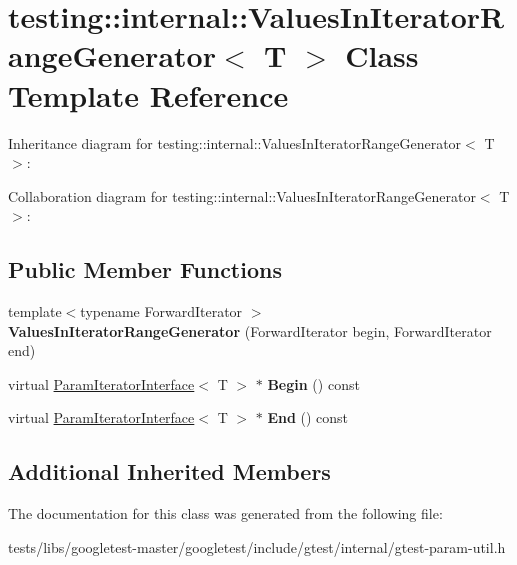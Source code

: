 \hypertarget{classtesting_1_1internal_1_1ValuesInIteratorRangeGenerator}{}\section{testing\+:\+:internal\+:\+:Values\+In\+Iterator\+Range\+Generator$<$ T $>$ Class Template Reference}
\label{classtesting_1_1internal_1_1ValuesInIteratorRangeGenerator}


Inheritance diagram for testing\+:\+:internal\+:\+:Values\+In\+Iterator\+Range\+Generator$<$ T $>$\+:


Collaboration diagram for testing\+:\+:internal\+:\+:Values\+In\+Iterator\+Range\+Generator$<$ T $>$\+:
\subsection*{Public Member Functions}
\begin{DoxyCompactItemize}
\item 
\mbox{\label{classtesting_1_1internal_1_1ValuesInIteratorRangeGenerator_a8b30f6028bc5739bbd7c24b0f0e409f7}} 
{\footnotesize template$<$typename Forward\+Iterator $>$ }\\{\bfseries Values\+In\+Iterator\+Range\+Generator} (Forward\+Iterator begin, Forward\+Iterator end)
\item 
\mbox{\label{classtesting_1_1internal_1_1ValuesInIteratorRangeGenerator_a91dac42f069cd06d05348fe5dd78639b}} 
virtual \hyperlink{classtesting_1_1internal_1_1ParamIteratorInterface}{Param\+Iterator\+Interface}$<$ T $>$ $\ast$ {\bfseries Begin} () const
\item 
\mbox{\label{classtesting_1_1internal_1_1ValuesInIteratorRangeGenerator_a4af95b9eccfc86c40a715df2d9d0df40}} 
virtual \hyperlink{classtesting_1_1internal_1_1ParamIteratorInterface}{Param\+Iterator\+Interface}$<$ T $>$ $\ast$ {\bfseries End} () const
\end{DoxyCompactItemize}
\subsection*{Additional Inherited Members}


The documentation for this class was generated from the following file\+:\begin{DoxyCompactItemize}
\item 
tests/libs/googletest-\/master/googletest/include/gtest/internal/gtest-\/param-\/util.\+h\end{DoxyCompactItemize}
